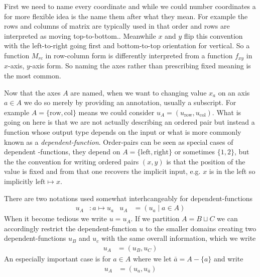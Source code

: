 First we need to name every coordinate and while we could number coordinates 
a for more flexible idea is the name them after what they mean.  For example 
the rows and columns of matrix are typically used in that order and rows 
are interpreted as moving top-to-bottom..  Meanwhile $x$ and $y$ flip this 
convention with the left-to-right going first and bottom-to-top orientation for 
vertical.  So a function $M_{rc}$ in row-column form is differently interpreted 
from a function $f_{xy}$ in $x$-axis, $y$-axis form.  So naming the axes 
rather than prescribing fixed meaning is the most common.

Now that the axes $A$ are named, when we want to changing value $x_a$ on an axis $a\in A$ 
we do so merely by providing an annotation, usually a subscript.
For example $A=\{\text{row},\text{col}\}$ means we could consider 
$u_A=(u_{\text{row}}, u_{\text{col}})$.  What is going on here is that we are not actually
describing an ordered pair but instead a function whose output type depends on the input
or what is more commonly known as a \emph{dependent-function}.  Order-pairs 
can be seen as special cases of dependent -functions, they depend on $A=\{\text{left},\text{right}\}$
or sometimes $\{1,2\}$, but the the convention for writing ordered pairs $(x,y)$ is that the 
position of the value is fixed and from that one recovers the implicit input, e.g. $x$ is in the left 
so implicitly $\text{left}\mapsto x$.

There are two notations used somewhat interhcangeably for dependent-functions
\begin{align}
    u_A & :a\mapsto u_a & 
    u_A & = (u_a\mid a\in A)
\end{align}
When it become tedious we write $u=u_A$.
If we partition $A=B\sqcup C$ we can accordingly restrict the dependent-function $u$ 
to the smaller domains creating two dependent-functions $u_B$ and $u_c$ with the same overall information,
which we write
\begin{align*}
    u_A & = (u_B, u_C)
\end{align*}
An especially important case is for $a\in A$ where we let $\bar{a}=A-\{a\}$ and write 
\begin{align*}
    u_A & = (u_a,u_{\bar{a}})
\end{align*}

